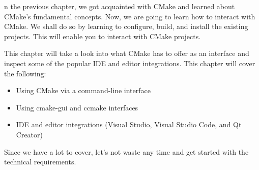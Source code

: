 n the previous chapter, we got acquainted with CMake and learned about CMake's fundamental concepts. Now, we are going to learn how to interact with CMake. We shall do so by learning to configure, build, and install the existing projects. This will enable you to interact with CMake projects.

This chapter will take a look into what CMake has to offer as an interface and inspect some of the popular IDE and editor integrations. This chapter will cover the following:

\begin{itemize}
\item 
Using CMake via a command-line interface

\item 
Using cmake-gui and ccmake interfaces

\item 
IDE and editor integrations (Visual Studio, Visual Studio Code, and Qt Creator)
\end{itemize}


Since we have a lot to cover, let's not waste any time and get started with the technical requirements.